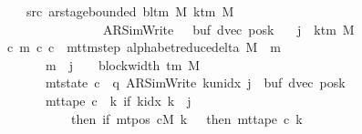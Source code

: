 \begin{isabellebody}
\ \ \ \ \ \ \ src{}{\isacharcolon}{\kern0pt}\ {\isachardoublequoteopen}ar{\isacharunderscore}{\kern0pt}stage{\isacharunderscore}{\kern0pt}bounded\ {\isacharparenleft}{\kern0pt}bl{\isacharunderscore}{\kern0pt}tm\ M{\isacharparenright}{\kern0pt}\ {\isacharparenleft}{\kern0pt}k{\isacharunderscore}{\kern0pt}tm\ M{\isacharparenright}{\kern0pt}\isanewline
\ \ \ \ \ \ \ \ \ \ \ \ \ \ \ \ \ \ \ {\isacharparenleft}{\kern0pt}AR{\isacharunderscore}{\kern0pt}SimWrite{\isacharcomma}{\kern0pt}\ {}{\isacharcomma}{\kern0pt}\ {}{\isacharcomma}{\kern0pt}\ buf{\isacharcomma}{\kern0pt}\ dvec{\isacharcomma}{\kern0pt}\ posk{\isacharparenright}{\kern0pt}{\isachardoublequoteclose}\isanewline
\ \ \ {\isachardoublequoteopen}j\ {\isasymle}\ k{\isacharunderscore}{\kern0pt}tm\ M\ {\isacharminus}{\kern0pt}\ {}\ {\isasymLongrightarrow}\isanewline
\ \ \ \ {\isacharparenleft}{\kern0pt}{\isasymexists}c\ m{\isachardot}{\kern0pt}\ {\isacharparenleft}{\kern0pt}c{}{\isacharcomma}{\kern0pt}\ c{\isacharparenright}{\kern0pt}\ {\isasymin}\ {\isacharparenleft}{\kern0pt}mttm{\isacharunderscore}{\kern0pt}step\ {\isacharparenleft}{\kern0pt}alphabet{\isacharunderscore}{\kern0pt}reduce{\isacharunderscore}{\kern0pt}delta\ M{\isacharparenright}{\kern0pt}{\isacharparenright}{\kern0pt}\ {\isacharcircum}{\kern0pt}{\isacharcircum}{\kern0pt}\ m\isanewline
\ \ \ \ \ \ \ \ \ {\isasymand}\ m\ {\isasymle}\ j\ {\isacharasterisk}{\kern0pt}\ {\isacharparenleft}{\kern0pt}{}\ {\isacharasterisk}{\kern0pt}\ block{\isacharunderscore}{\kern0pt}width\ {\isacharparenleft}{\kern0pt}{\isasymGamma}{\isacharunderscore}{\kern0pt}tm\ M{\isacharparenright}{\kern0pt}{\isacharparenright}{\kern0pt}\isanewline
\ \ \ \ \ \ \ \ \ {\isasymand}\ mt{\isacharunderscore}{\kern0pt}state\ c\ {\isacharequal}{\kern0pt}\ {\isacharparenleft}{\kern0pt}q{\isacharcomma}{\kern0pt}\ AR{\isacharunderscore}{\kern0pt}SimWrite{\isacharcomma}{\kern0pt}\ k{\isacharunderscore}{\kern0pt}unidx\ j{\isacharcomma}{\kern0pt}\ {}{\isacharcomma}{\kern0pt}\ buf{\isacharcomma}{\kern0pt}\ dvec{\isacharcomma}{\kern0pt}\ posk{\isacharparenright}{\kern0pt}\isanewline
\ \ \ \ \ \ \ \ \ {\isasymand}\ mt{\isacharunderscore}{\kern0pt}tape\ c\ {\isacharequal}{\kern0pt}\ {\isacharparenleft}{\kern0pt}{\isasymlambda}k{\isachardot}{\kern0pt}\ if\ k{\isacharunderscore}{\kern0pt}idx\ k\ {\isacharless}{\kern0pt}\ j\isanewline
\ \ \ \ \ \ \ \ \ \ \ \ \ \ then\ {\isacharparenleft}{\kern0pt}if\ mt{\isacharunderscore}{\kern0pt}pos\ cM\ k\ {\isacharequal}{\kern0pt}\ {}\ then\ mt{\isacharunderscore}{\kern0pt}tape\ c{}\ k\isanewline

\end{isabellebody}
